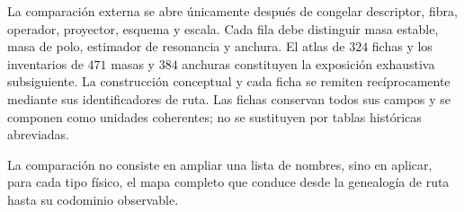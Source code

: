La comparación externa se abre únicamente después de congelar descriptor,
fibra, operador, proyector, esquema y escala. Cada fila debe distinguir masa
estable, masa de polo, estimador de resonancia y anchura. El atlas de \(324\)
fichas y los inventarios de \(471\) masas y \(384\) anchuras constituyen la
exposición exhaustiva subsiguiente. La construcción conceptual y cada ficha
se remiten recíprocamente mediante sus identificadores de ruta. Las fichas
conservan todos sus campos y se componen como unidades coherentes; no se
sustituyen por tablas históricas abreviadas.

La comparación no consiste en ampliar una lista de nombres, sino en aplicar,
para cada tipo físico, el mapa completo que conduce desde la genealogía de ruta
hasta su codominio observable.
